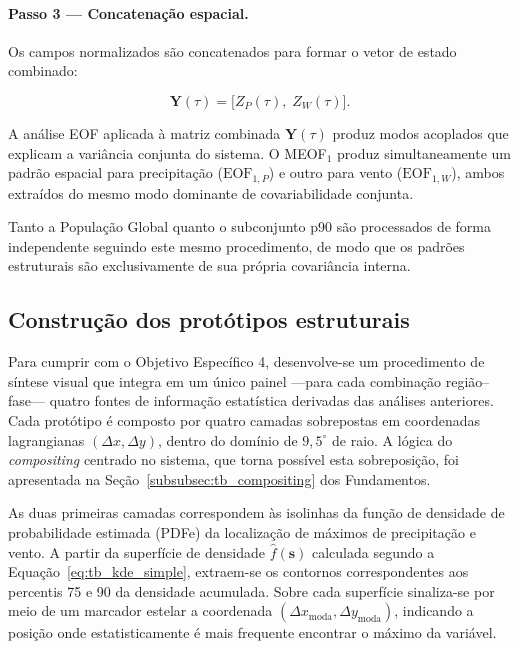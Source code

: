 \paragraph{Passo 3 — Concatenação espacial.} Os campos normalizados são concatenados para formar o vetor de estado combinado:

\begin{equation}\label{eq:meof_vector}
    \mathbf{Y}(\tau) = \big[ Z_P(\tau),\; Z_W(\tau) \big].
\end{equation}

A análise EOF aplicada à matriz combinada $\mathbf{Y}(\tau)$ produz modos acoplados que explicam a variância conjunta do sistema. O MEOF$_1$ produz simultaneamente um padrão espacial para precipitação ($\text{EOF}_{1,P}$) e outro para vento ($\text{EOF}_{1,W}$), ambos extraídos do mesmo modo dominante de covariabilidade conjunta.

Tanto a População Global quanto o subconjunto p90 são processados de forma independente seguindo este mesmo procedimento, de modo que os padrões estruturais são exclusivamente de sua própria covariância interna.

\subsection{Construção dos protótipos estruturais}\label{subsec:prototipos}
Para cumprir com o Objetivo Específico 4, desenvolve-se um procedimento de síntese visual que integra em um único painel ---para cada combinação região--fase--- quatro fontes de informação estatística derivadas das análises anteriores. Cada protótipo é composto por quatro camadas sobrepostas em coordenadas lagrangianas $(\Delta x, \Delta y)$, dentro do domínio de $9{,}5^{\circ}$ de raio. A lógica do \textit{compositing} centrado no sistema, que torna possível esta sobreposição, foi apresentada na Seção~\ref{subsubsec:tb_compositing} dos Fundamentos.

As duas primeiras camadas correspondem às isolinhas da função de densidade de probabilidade estimada (PDFe) da localização de máximos de precipitação e vento. A partir da superfície de densidade $\hat{f}(\mathbf{s})$ calculada segundo a Equação~\ref{eq:tb_kde_simple}, extraem-se os contornos correspondentes aos percentis 75 e 90 da densidade acumulada. Sobre cada superfície sinaliza-se por meio de um marcador estelar a coordenada $(\Delta x_{\text{moda}}, \Delta y_{\text{moda}})$, indicando a posição onde estatisticamente é mais frequente encontrar o máximo da variável.

